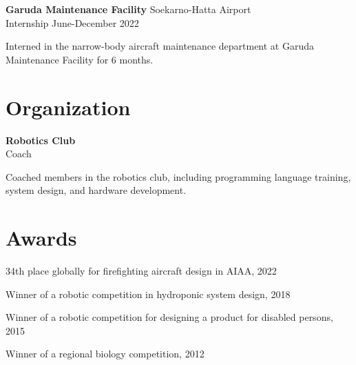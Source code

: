 \documentclass[12pt]{report}
\begin{document}
    \textbf{Garuda Maintenance Facility} \hfill Soekarno-Hatta Airport \\
    Internship \hfill June-December 2022 \\
    \begin{myitemize}[left=0pt]
        \item Interned in the narrow-body aircraft maintenance department at Garuda Maintenance Facility for 6 months.
    \end{myitemize}

    \section*{Organization}
    \textbf{Robotics Club} \\
    Coach \\
    \begin{myitemize}[left=0pt]
        \item Coached members in the robotics club, including programming language training, system design, and hardware development.
    \end{myitemize}

    \section*{Awards}
    \begin{myitemize}[left=0pt]
        \item 34th place globally for firefighting aircraft design in AIAA, 2022
        \item Winner of a robotic competition in hydroponic system design, 2018
        \item Winner of a robotic competition for designing a product for disabled persons, 2015
        \item Winner of a regional biology competition, 2012
    \end{myitemize}
\end{document}

